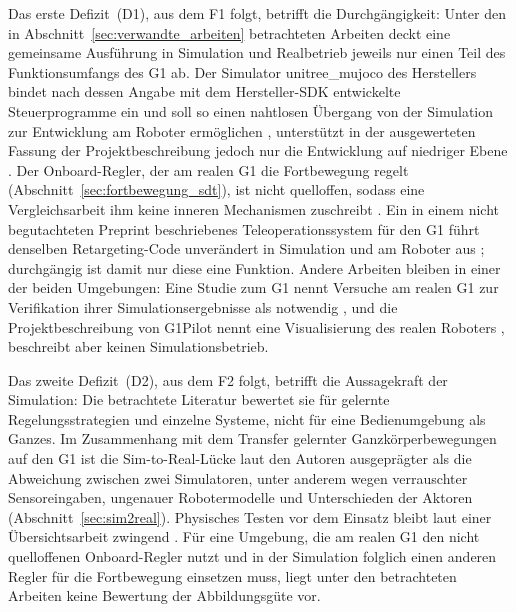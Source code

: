 Das erste Defizit~(D1), aus dem F1 folgt, betrifft die Durchgängigkeit: Unter den in Abschnitt~\ref{sec:verwandte_arbeiten} betrachteten Arbeiten deckt eine gemeinsame Ausführung in Simulation und Realbetrieb jeweils nur einen Teil des Funktionsumfangs des G1 ab.
Der Simulator unitree\_mujoco des Herstellers bindet nach dessen Angabe mit dem Hersteller-SDK entwickelte Steuerprogramme ein und soll so einen nahtlosen Übergang von der Simulation zur Entwicklung am Roboter ermöglichen \cite{UnitreeMujoco}, unterstützt in der ausgewerteten Fassung der Projektbeschreibung jedoch nur die Entwicklung auf niedriger Ebene \cite{UnitreeMujoco}.
Der Onboard-Regler, der am realen G1 die Fortbewegung regelt (Abschnitt~\ref{sec:fortbewegung_sdt}), ist nicht quelloffen, sodass eine Vergleichsarbeit ihm keine inneren Mechanismen zuschreibt \cite{Hu2026}.
Ein in einem nicht begutachteten Preprint beschriebenes Teleoperationssystem für den G1 führt denselben Retargeting-Code unverändert in Simulation und am Roboter aus \cite{Durrani2026}; durchgängig ist damit nur diese eine Funktion.
Andere Arbeiten bleiben in einer der beiden Umgebungen: Eine Studie zum G1 nennt Versuche am realen G1 zur Verifikation ihrer Simulationsergebnisse als notwendig \cite{Yu2026}, und die Projektbeschreibung von G1Pilot nennt eine Visualisierung des realen Roboters \cite{HucebotG1Pilot}, beschreibt aber keinen Simulationsbetrieb.

Das zweite Defizit~(D2), aus dem F2 folgt, betrifft die Aussagekraft der Simulation: Die betrachtete Literatur bewertet sie für gelernte Regelungsstrategien und einzelne Systeme, nicht für eine Bedienumgebung als Ganzes.
Im Zusammenhang mit dem Transfer gelernter Ganzkörperbewegungen auf den G1 ist die Sim-to-Real-Lücke laut den Autoren ausgeprägter als die Abweichung zwischen zwei Simulatoren, unter anderem wegen verrauschter Sensoreingaben, ungenauer Robotermodelle und Unterschieden der Aktoren \cite{He2025} (Abschnitt~\ref{sec:sim2real}).
Physisches Testen vor dem Einsatz bleibt laut einer Übersichtsarbeit zwingend \cite{Choi2021}.
Für eine Umgebung, die am realen G1 den nicht quelloffenen Onboard-Regler nutzt und in der Simulation folglich einen anderen Regler für die Fortbewegung einsetzen muss, liegt unter den betrachteten Arbeiten keine Bewertung der Abbildungsgüte vor.

